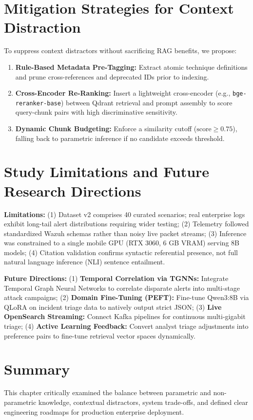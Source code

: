 \section{Mitigation Strategies for Context Distraction}
\label{sec:distractor_mitigations}
To suppress context distractors without sacrificing RAG benefits, we propose:
\begin{enumerate}[itemsep=1pt,topsep=2pt]
    \item \textbf{Rule-Based Metadata Pre-Tagging:} Extract atomic technique definitions and prune cross-references and deprecated IDs prior to indexing.
    \item \textbf{Cross-Encoder Re-Ranking:} Insert a lightweight cross-encoder (e.g., \texttt{bge-reranker-base}) between Qdrant retrieval and prompt assembly to score query-chunk pairs with high discriminative sensitivity.
    \item \textbf{Dynamic Chunk Budgeting:} Enforce a similarity cutoff ($\text{score} \ge 0.75$), falling back to parametric inference if no candidate exceeds threshold.
\end{enumerate}

\section{Study Limitations and Future Research Directions}
\label{sec:study_limitations}
\textbf{Limitations:} (1) Dataset v2 comprises 40 curated scenarios; real enterprise logs exhibit long-tail alert distributions requiring wider testing; (2) Telemetry followed standardized Wazuh schemas rather than noisy live packet streams; (3) Inference was constrained to a single mobile GPU (RTX 3060, 6 GB VRAM) serving 8B models; (4) Citation validation confirms syntactic referential presence, not full natural language inference (NLI) sentence entailment.

\textbf{Future Directions:} (1) \textbf{Temporal Correlation via TGNNs:} Integrate Temporal Graph Neural Networks to correlate disparate alerts into multi-stage attack campaigns; (2) \textbf{Domain Fine-Tuning (PEFT):} Fine-tune Qwen3:8B via QLoRA on incident triage data to natively output strict JSON; (3) \textbf{Live OpenSearch Streaming:} Connect Kafka pipelines for continuous multi-gigabit triage; (4) \textbf{Active Learning Feedback:} Convert analyst triage adjustments into preference pairs to fine-tune retrieval vector spaces dynamically.

\section{Summary}
\label{sec:ch9_summary}
This chapter critically examined the balance between parametric and non-parametric knowledge, contextual distractors, system trade-offs, and defined clear engineering roadmaps for production enterprise deployment.